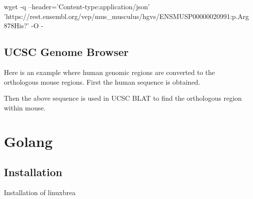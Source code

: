 \documentclass[]{book}
\newenvironment{Shaded}{\begin{snugshade}}{\end{snugshade}}
\newcommand{\FunctionTok}[1]{\textcolor[rgb]{0.00,0.00,0.00}{#1}}
\newcommand{\NormalTok}[1]{#1}
\newcommand{\OperatorTok}[1]{\textcolor[rgb]{0.81,0.36,0.00}{\textbf{#1}}}
\newcommand{\StringTok}[1]{\textcolor[rgb]{0.31,0.60,0.02}{#1}}
\begin{document}
\begin{Shaded}
\begin{Highlighting}[]
\FunctionTok{wget}\NormalTok{ -q --header=}\StringTok{'Content-type:application/json'} \StringTok{'https://rest.ensembl.org/vep/mus_musculus/hgvs/ENSMUSP00000020991:p.Arg878His?'}\NormalTok{  -O -}
\end{Highlighting}
\end{Shaded}

\hypertarget{ucsc-genome-browser-1}{%
\section{UCSC Genome Browser}\label{ucsc-genome-browser-1}}

Here is an example where human genomic regions are converted to the orthologous mouse regions. First the human sequence is obtained.

\begin{Shaded}
\end{Shaded}

Then the above sequence is used in UCSC BLAT to find the orthologous region within mouse.

\hypertarget{golang}{%
\chapter{Golang}\label{golang}}

\hypertarget{installation}{%
\section{Installation}\label{installation}}

Installation of linuxbrea
\end{document}
